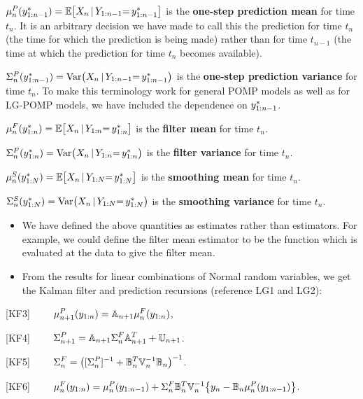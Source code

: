 \documentclass[]{article}
\begin{document}
\(\mu_n^P(y_{1:n-1}^*)=\mathbb{E}\big[X_n{\, | \,} Y_{1:n-1}{=\,} y_{1:n-1}^*\big]\)
is the \textbf{one-step prediction mean} for time \(t_n\). It is an
arbitrary decision we have made to call this the prediction for time
\(t_n\) (the time for which the prediction is being made) rather than
for time \(t_{n-1}\) (the time at which the prediction for time \(t_n\)
becomes available).

\(\Sigma_n^P(y_{1:n-1}^*)=\mathrm{Var}\big(X_n{\, | \,} Y_{1:n-1}{=\,} y_{1:n-1}^*\big)\)
is the \textbf{one-step prediction variance} for time \(t_n\). To make
this terminology work for general POMP models as well as for LG-POMP
models, we have included the dependence on \(y_{1:n-1}^*\).

\(\mu_n^F(y_{1:n}^*)=\mathbb{E}\big[X_n{\, | \,} Y_{1:n}{=\,} y_{1:n}^*\big]\)
is the \textbf{filter mean} for time \(t_n\).

\(\Sigma_n^F(y_{1:n}^*)=\mathrm{Var}\big(X_n{\, | \,} Y_{1:n}{=\,} y_{1:n}^*\big)\)
is the \textbf{filter variance} for time \(t_n\).

\(\mu_n^S(y_{1:N}^*)=\mathbb{E}\big[X_n{\, | \,} Y_{1:N}{=\,} y_{1:N}^*\big]\)
is the \textbf{smoothing mean} for time \(t_n\).

\(\Sigma_n^S(y_{1:N}^*)=\mathrm{Var}\big(X_n{\, | \,} Y_{1:N}{=\,} y_{1:N}^*\big)\)
is the \textbf{smoothing variance} for time \(t_n\).

\begin{itemize}
\item
  We have defined the above quantities as estimates rather than
  estimators. For example, we could define the filter mean estimator to
  be the function which is evaluated at the data to give the filter
  mean.
\item
  From the results for linear combinations of Normal random variables,
  we get the Kalman filter and prediction recursions (reference LG1 and LG2):
\end{itemize}

{[}KF3{]}
\(\quad\quad \displaystyle   \mu_{n+1}^P(y_{1:n}) = \mathbb{A}_{n+1} \mu_{n}^F(y_{1:n})\),

{[}KF4{]}
\(\quad\quad \displaystyle   \Sigma_{n+1}^P = \mathbb{A}_{n+1} \Sigma_{n}^F \mathbb{A}_{n+1}^{\scriptsize{T}} + \mathbb{U}_{n+1}\).

{[}KF5{]}
\(\quad\quad \displaystyle   \Sigma_{n}^F = \big([\Sigma_n^P]^{-1} + \mathbb{B}_n^{\scriptsize{T}}\mathbb{V}_n^{-1}\mathbb{B}_n\big)^{-1}\).

{[}KF6{]}
\(\quad\quad \displaystyle   \mu_{n}^F(y_{1:n}) = \mu_{n}^P(y_{1:n-1}) + \Sigma_n^F \mathbb{B}^{\scriptsize{T}}_n\mathbb{V}_n^{-1}\big\{y_n - \mathbb{B}_n\mu_n^P(y_{1:n-1})\big\}\).
\end{document}
